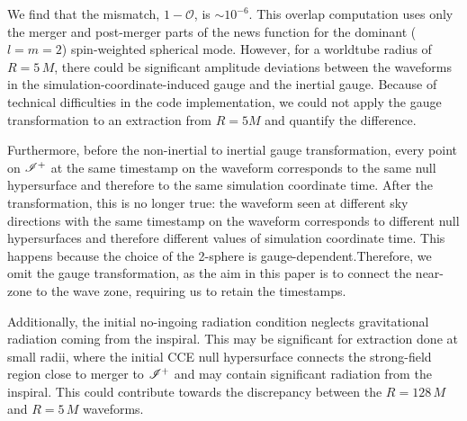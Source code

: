 We find that the mismatch, $1 - \mathcal{O}$, is $ \sim 10^{-6}$. This overlap computation uses only the merger and post-merger parts of the news function for the dominant ($l=m=2$) spin-weighted spherical mode. However, for a worldtube radius of $R=5\,M$, there could be significant amplitude deviations between the waveforms in the simulation-coordinate-induced gauge and the inertial gauge. Because of technical difficulties in the code implementation, we could not apply the gauge transformation to an extraction from $R=5 M$ and quantify the difference.


Furthermore, before the non-inertial to inertial gauge transformation, every point on $\mathscr{I^+}$ at the same timestamp on the waveform corresponds to the same null hypersurface and therefore to the same simulation coordinate time. After the transformation, this is no longer true: the waveform seen at different sky directions with the same timestamp on the waveform corresponds to different null hypersurfaces and therefore different values of simulation coordinate time. This happens because the choice of the 2-sphere is gauge-dependent.Therefore, we omit the gauge transformation, as the aim in this paper is to connect the near-zone to the wave zone, requiring us to retain the timestamps.


Additionally, the initial no-ingoing radiation condition neglects gravitational radiation coming from the inspiral. This may be significant for extraction done at small radii, where the initial CCE null hypersurface connects the strong-field region close to merger to $\mathscr{I^+}$ and may contain significant radiation from the inspiral. This could contribute towards the discrepancy between the $R=128\,M$ and $R=5\,M$ waveforms. 

